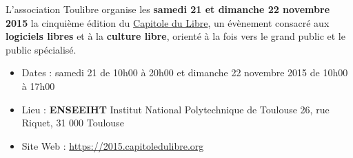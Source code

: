 

\begin{doublespace}
\begin{large}
  L'association Toulibre organise les \textbf{samedi 21 et dimanche 22 novembre 2015} la cinquième
  édition du \href{http://capitoledulibre.org}{Capitole du Libre},
  un évènement consacré aux \textbf{logiciels libres} et à la \textbf{culture libre},
  orienté à la fois vers le grand public et le public spécialisé.
\end{large}
\end{doublespace}
\begin{itemize}[label=$\bullet$]
\item Dates : samedi 21 de 10h00 à 20h00 et dimanche 22 novembre 2015 de 10h00 à 17h00
\item Lieu : \textbf{ENSEEIHT} Institut National Polytechnique de Toulouse
26, rue Riquet, 31 000 Toulouse
\item Site Web : \url{https://2015.capitoledulibre.org}
\end{itemize}
